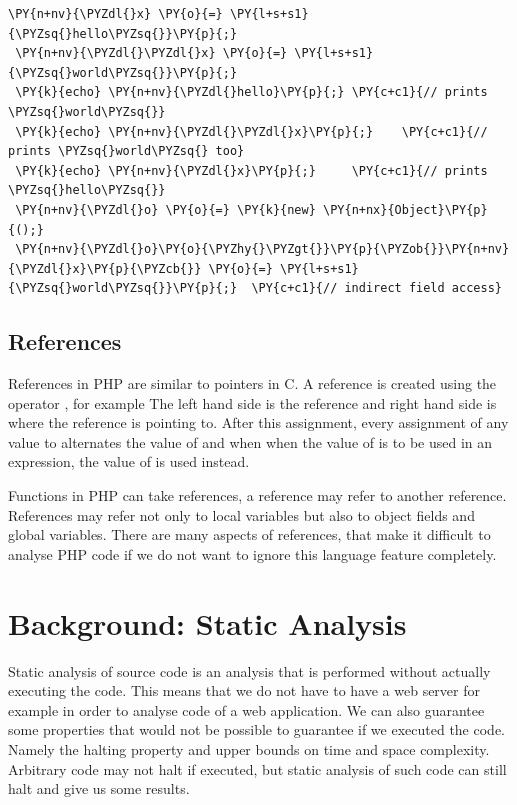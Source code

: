 \begin{Verbatim}[commandchars=\\\{\}]
 \PY{n+nv}{\PYZdl{}x} \PY{o}{=} \PY{l+s+s1}{\PYZsq{}hello\PYZsq{}}\PY{p}{;}
 \PY{n+nv}{\PYZdl{}\PYZdl{}x} \PY{o}{=} \PY{l+s+s1}{\PYZsq{}world\PYZsq{}}\PY{p}{;}
 \PY{k}{echo} \PY{n+nv}{\PYZdl{}hello}\PY{p}{;} \PY{c+c1}{// prints \PYZsq{}world\PYZsq{}}
 \PY{k}{echo} \PY{n+nv}{\PYZdl{}\PYZdl{}x}\PY{p}{;}    \PY{c+c1}{// prints \PYZsq{}world\PYZsq{} too}
 \PY{k}{echo} \PY{n+nv}{\PYZdl{}x}\PY{p}{;}     \PY{c+c1}{// prints \PYZsq{}hello\PYZsq{}}
 \PY{n+nv}{\PYZdl{}o} \PY{o}{=} \PY{k}{new} \PY{n+nx}{Object}\PY{p}{();}
 \PY{n+nv}{\PYZdl{}o}\PY{o}{\PYZhy{}\PYZgt{}}\PY{p}{\PYZob{}}\PY{n+nv}{\PYZdl{}x}\PY{p}{\PYZcb{}} \PY{o}{=} \PY{l+s+s1}{\PYZsq{}world\PYZsq{}}\PY{p}{;}  \PY{c+c1}{// indirect field access}
\end{Verbatim}

\subsection{References}
References in PHP are similar to pointers in C. A reference is 
created using the operator \code{\&=}, 
for example  The left hand side is 
the reference and right hand side is where the reference 
is pointing to. After this assignment, every assignment of any 
value to  alternates the value of  and 
when when the value of  is to be used in an expression, 
the value of  is used instead.

Functions in PHP can take references, a reference may 
refer to another reference. References may refer not only to 
local variables but also to object fields and global variables. 
There are many aspects of references, that make it difficult 
to analyse PHP code if we do not want to ignore this 
language feature completely.

\section{Background: Static Analysis}
Static analysis of source code is an analysis that is performed without 
actually executing the code. This means that we do not have to have a
web server for example in order to analyse code of a web application. 
We can also guarantee some properties that would not be possible to 
guarantee if we executed the code. Namely the halting property and 
upper bounds on time and space complexity. Arbitrary code may not 
halt if executed, but static analysis of such code can still halt 
and give us some results.

